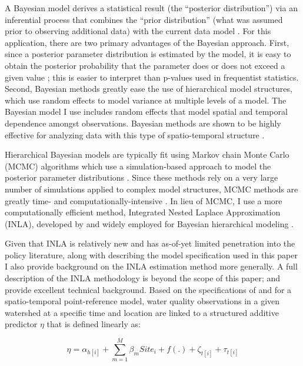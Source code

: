 \documentclass[11pt,a4paper,titlepage]{article}
\begin{document}
A Bayesian model derives a statistical result (the “posterior distribution”) via an inferential process that combines the “prior distribution” (what was assumed prior to observing additional data) with the current data model \parencite{bernardo2009}. For this application, there are two primary advantages of the Bayesian approach. First, since a posterior parameter distribution is estimated by the model, it is easy to obtain the posterior probability that the parameter does or does not exceed a given value \parencite{blangiardo2013}; this is easier to interpret than p-values used in frequentist statistics. Second, Bayesian methods greatly ease the use of hierarchical model structures, which use random effects to model variance at multiple levels of a model. The Bayesian model I use includes random effects that model spatial and temporal dependence amongst observations. Bayesian methods are shown to be highly effective for analyzing data with this type of spatio-temporal structure \parencite{dunson2001}. 

Hierarchical Bayesian models are typically fit using Markov chain Monte Carlo (MCMC) algorithms which use a simulation-based approach to model the posterior parameter distributions \parencite{brooks2011,robert2004,lesage2010}. Since these methods rely on a very large number of simulations applied to complex model structures, MCMC methods are greatly time- and computationally-intensive \parencite{blangiardo2013}. In lieu of MCMC, I use a more computationally efficient method, Integrated Nested Laplace Approximation (INLA), developed by \textcite{rue2009} and widely employed for Bayesian hierarchical modeling \parencite{beguin2012,martino2011,martino2010,lindgren2011,cosandey-godin2014}.

Given that INLA is relatively new and has as-of-yet limited penetration into the policy literature, along with describing the model specification used in this paper I also provide background on the INLA estimation method more generally. A full description of the INLA methodology is beyond the scope of this paper; \textcite{rue2014} and \textcite{lindgren2013} provide excellent technical background. Based on the specifications of \textcite{cameletti2013}and \textcite{cosandey-godin2014} for a spatio-temporal point-reference model, water quality observations in a given watershed at a specific time and location are linked to a structured additive predictor $\eta$ that is defined linearly as:

\begin{equation}
\eta = \alpha_{h[i]} + \sum_{m=1}^{M} \beta_{m}Site_{i} + f(.) + \zeta_{t[i]} + \tau_{t[i]}
\label{eq:obslevel}
\end{equation}
\end{document}
